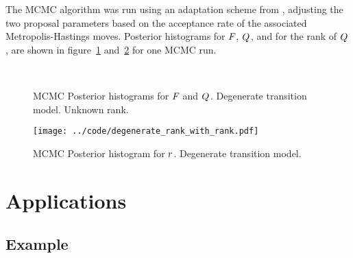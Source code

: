 \documentclass[journal,10pt]{IEEEtran}
\begin{document}
The MCMC algorithm was run using an adaptation scheme from \cite{Roberts2009}, adjusting the two proposal parameters based on the acceptance rate of the associated Metropolis-Hastings moves. Posterior histograms for $F_{}$, $Q_{}$, and for the rank of $Q_{}$, are shown in figure~\ref{fig:degenerate_FQ_histograms} and~\ref{fig:degenerate_rank_histograms} for one MCMC run.

\begin{figure}
 \centering
  \\
 \caption{MCMC Posterior histograms for \protect{} $F_{}$ and \protect{} $Q_{}$. Degenerate transition model. Unknown rank.}
 \label{fig:degenerate_FQ_histograms}
\end{figure}

\begin{figure}
 \centering
 \texttt{[image: ../code/degenerate\_rank\_with\_rank.pdf]} 
 \caption{MCMC Posterior histogram for $r$. Degenerate transition model.}
 \label{fig:degenerate_rank_histograms}
\end{figure}



\section{Applications} \label{sec:applications}

\subsection{Example} \label{sec:example_basic}
\end{document}
